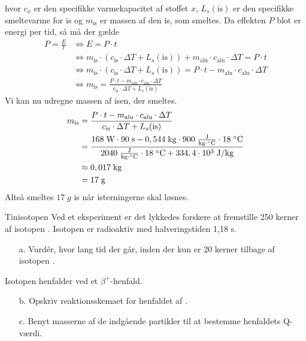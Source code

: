 \documentclass{report}
\begin{document}
hvor $c _{x}$ er den specifikke varmekapacitet af stoffet $x$, $L_s(\text{is} )$ er den specifikke smeltevarme for is og $m _{\text{is} }$ er massen af den is, som smeltes. 
Da effekten $P$ blot er energi per tid, så må der gælde
\begin{equation*}
\begin{split}
  P=\frac{E}{t} &\iff E=P \cdot t \\
  &\iff m _{\text{is} } \cdot \left(c _{\text{is} } \cdot \Delta T + L_s(\text{is} )\right) + m _{\text{alu} } \cdot c _{\text{alu} }\cdot \Delta T=P \cdot t\\
  &\iff m _{\text{is} } \cdot \left(c _{\text{is} } \cdot \Delta T + L_s(\text{is} )\right) =P \cdot t- m _{\text{alu} } \cdot c _{\text{alu} }\cdot \Delta T\\
  &\iff m _{\text{is} }=\frac{P \cdot t- m _{\text{alu} } \cdot c _{\text{alu} }\cdot \Delta T}{c _{\text{is} } \cdot \Delta T + L_s(\text{is} )}
\end{split}
\end{equation*}
Vi kan nu udregne massen af isen, der smeltes.
\begin{equation*}
\begin{split}
  m _{\text{is} }&=\frac{P \cdot t- m _{\text{alu} } \cdot c _{\text{alu} }\cdot \Delta T}{c _{\text{is} } \cdot \Delta T + L_s(\text{is} )}\\
  &=\frac{168 \;\unit{W} \cdot 90 \;\unit{s} - 0,544 \;\unit{kg}  \cdot 900 \;\unit{\frac{J}{kg \cdot \celsius}} \cdot 18 \;\unit{\celsius}}{2040 \;\unit{\frac{J}{kg \cdot \celsius}}  \cdot 18 \;\unit{\celsius}  + 334,4 \cdot 10^3 \;\unit{J/kg} }\\
  &\approx 0,017 \;\unit{kg} \\
  &=17 \;\unit{g} 
\end{split}
\end{equation*}
Altså smeltes $17 \;\unit{g} $ is når isterningerne skal løsnes. 
\begin{question}{Tinisotopen  }{}
Ved et eksperiment er det lykkedes forskere at fremstille 250 kerner af isotopen . Isotopen  er radioaktiv med halveringstiden 1,18 s.
\begin{itemize}
  \item[a.] Vurdér, hvor lang tid der går, inden der kun er 20 kerner tilbage af isotopen .
\end{itemize}
Isotopen  henfalder ved et $\beta ^+$-henfald. 
\begin{itemize}
  \item[b.] Opskriv reaktionsskemaet for henfaldet af . 
  \item[c.] Benyt masserne af de indgående partikler til at bestemme henfaldets Q-værdi. 
\end{itemize}
\end{question}
\end{document}
